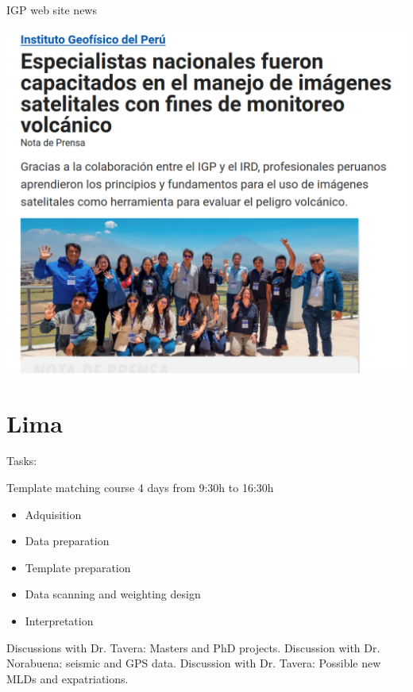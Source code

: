 \documentclass{beamer}
\begin{document}
\begin{frame}
 
 {IGP web site news}
 
 \centering
 \includegraphics[width=0.9\linewidth]{images/IGP_site}
 
\end{frame}



\section{Lima}

\begin{frame}
 
 {Tasks:} \pause
 
 Template matching course 4 days from 9:30h to 16:30h \pause
 \begin{itemize}
  \item Adquisition \pause
  \item Data preparation \pause
  \item Template preparation \pause
  \item Data scanning and weighting design \pause
  \item Interpretation \pause
 \end{itemize}
 \vskip 0.5cm
 Discussions with Dr. Tavera: Masters and PhD projects. \pause
 \vskip 0.5cm
 Discussion with Dr. Norabuena: seismic and GPS data. \pause
 \vskip 0.5cm
 Discussion with Dr. Tavera: Possible new MLDs and expatriations.
 
\end{frame}
\end{document}
